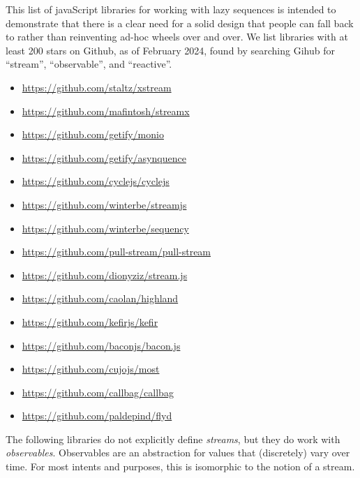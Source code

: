 \documentclass[sigplan,screen,10pt,anonymous,review]{acmart}
\begin{document}
This list of javaScript libraries for working with lazy sequences is intended to demonstrate that there is a clear need for a solid design that people can fall back to rather than reinventing ad-hoc wheels over and over. We list libraries with at least 200 stars on Github, as of February 2024, found by searching Gihub for ``stream'', ``observable'', and ``reactive''.

\begin{itemize}
    \item \url{https://github.com/staltz/xstream}
    \item \url{https://github.com/mafintosh/streamx}
    \item \url{https://github.com/getify/monio}
    \item \url{https://github.com/getify/asynquence}
    \item \url{https://github.com/cyclejs/cyclejs}
    \item \url{https://github.com/winterbe/streamjs}
    \item \url{https://github.com/winterbe/sequency}
    \item \url{https://github.com/pull-stream/pull-stream}
    \item \url{https://github.com/dionyziz/stream.js}
    \item \url{https://github.com/caolan/highland}
    \item \url{https://github.com/kefirjs/kefir}
    \item \url{https://github.com/baconjs/bacon.js}
    \item \url{https://github.com/cujojs/most}
    \item \url{https://github.com/callbag/callbag}
    \item \url{https://github.com/paldepind/flyd}
\end{itemize}
    
The following libraries do not explicitly define \textit{streams}, but they do work with \textit{observables}. Observables are an abstraction for values that (discretely) vary over time. For most intents and purposes, this is isomorphic to the notion of a stream.
\end{document}
